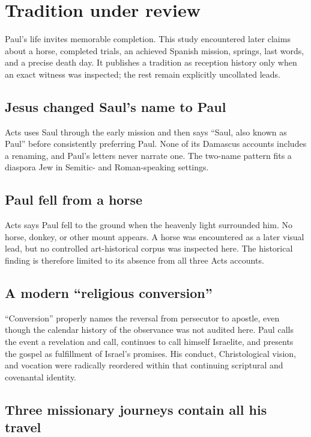 \section{Tradition under review}\label{sec:paul-tradition}

Paul's life invites memorable completion. This study encountered later claims
about a horse, completed trials, an achieved Spanish mission, springs, last
words, and a precise death day. It publishes a tradition as reception history
only when an exact witness was inspected; the rest remain explicitly
uncollated leads.

\subsection{Jesus changed Saul's name to Paul}

Acts uses Saul through the early mission and then says ``Saul, also known as
Paul'' before consistently preferring Paul. None of its Damascus accounts
includes a renaming, and Paul's letters never narrate one. The two-name pattern
fits a diaspora Jew in Semitic- and Roman-speaking settings.

\subsection{Paul fell from a horse}

Acts says Paul fell to the ground when the heavenly light surrounded him. No
horse, donkey, or other mount appears. A horse was encountered as a later
visual lead, but no controlled art-historical corpus was inspected here. The
historical finding is therefore limited to its absence from all three Acts
accounts.

\subsection{A modern ``religious conversion''}

``Conversion'' properly names the reversal from persecutor to apostle, even
though the calendar history of the observance was not audited here. Paul calls
the event a revelation and call, continues to call himself Israelite, and
presents the gospel as fulfillment of Israel's promises. His conduct,
Christological vision, and vocation were radically reordered within that
continuing scriptural and covenantal identity.

\subsection{Three missionary journeys contain all his travel}

